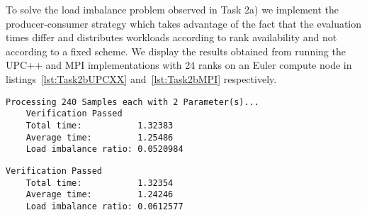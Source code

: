 \documentclass[11pt]{article}
\begin{document}
    To solve the load imbalance problem observed in Task 2a) we implement
    the producer-consumer strategy which takes advantage of the fact that the
    evaluation times differ and distributes workloads
    according to rank availability and not according to a fixed scheme.
    We display the results obtained from running the UPC++ and MPI
    implementations with 24 ranks on an Euler compute node in
    listings~\ref{lst:Task2bUPCXX} and~\ref{lst:Task2bMPI} respectively.

    \begin{lstlisting}[basicstyle=\tiny, frame=single, caption={Output from
    executing the UPC++ tasking engine with the producer-consumer strategy.},
    label={lst:Task2bUPCXX}]
    Processing 240 Samples each with 2 Parameter(s)...
    Verification Passed
    Total time:           1.32383
    Average time:         1.25486
    Load imbalance ratio: 0.0520984
    \end{lstlisting}

    \begin{lstlisting}[basicstyle=\tiny, frame=single, caption={Output from
    executing the MPI tasking engine with the producer-consumer strategy.},
    label={lst:Task2bMPI}]
    Verification Passed
    Total time:           1.32354
    Average time:         1.24246
    Load imbalance ratio: 0.0612577
    \end{lstlisting}
\end{document}
